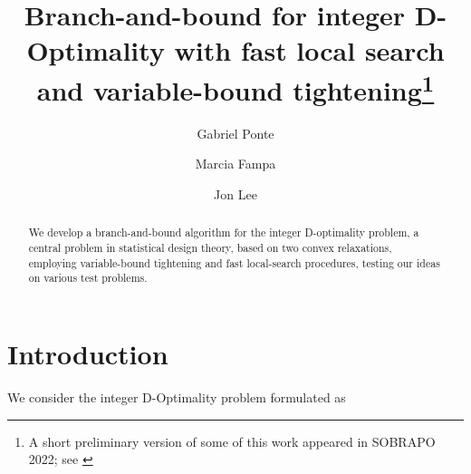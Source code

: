 \documentclass[smallextended]{svjour3hack}       %
\begin{document}
\title{Branch-and-bound for integer D-Optimality with fast local search and variable-bound tightening\footnote{A short preliminary version of some of this work appeared in  SOBRAPO 2022; see \cite{PonteFampaLeeSBPO22}}}
  \author{Gabriel Ponte \and Marcia Fampa \and Jon Lee}



\date{}


\maketitle
\begin{abstract}
We develop a branch-and-bound  algorithm
for the integer D-optimality problem, a central problem in statistical design theory,  
based on two convex relaxations,  employing
 variable-bound tightening and fast local-search procedures, testing our ideas on 
 various test problems. 
\end{abstract}

\section{Introduction} 


We consider the integer D-Optimality problem formulated as 
\vskip-10pt 
\end{document}
